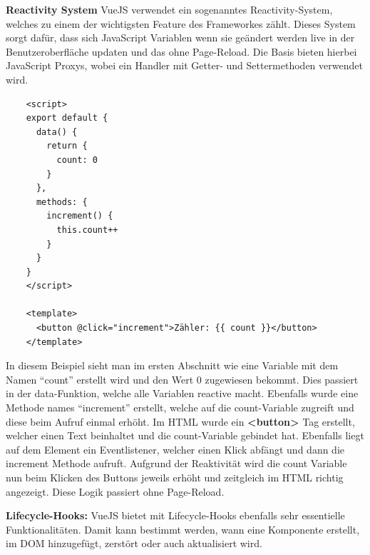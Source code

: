 \cite{frontend_web_vuejs_api}

\textbf{Reactivity System}
\newline
VueJS verwendet ein sogenanntes Reactivity-System, welches zu einem der wichtigsten Feature des Frameworkes zählt. Dieses System sorgt dafür, dass sich JavaScript Variablen wenn sie geändert werden live in der Benutzeroberfläche updaten und das ohne Page-Reload. Die Basis bieten hierbei JavaScript Proxys, wobei ein Handler mit Getter- und Settermethoden verwendet wird. 

\begin{lstlisting}
    <script>
    export default {
      data() {
        return {
          count: 0
        }
      },
      methods: {
        increment() {
          this.count++
        }
      }
    }
    </script>
    
    <template>
      <button @click="increment">Zähler: {{ count }}</button>
    </template>
\end{lstlisting}

\cite{frontend_web_vuejs_reactivity}

In diesem Beispiel sieht man im ersten Abschnitt wie eine Variable mit dem Namen “count” erstellt wird und den Wert 0 zugewiesen bekommt. Dies passiert in der data-Funktion, welche alle Variablen reactive macht. Ebenfalls wurde eine Methode names “increment” erstellt, welche auf die count-Variable zugreift und diese beim Aufruf einmal erhöht. Im HTML wurde ein \textbf{<button>} Tag erstellt, welcher einen Text beinhaltet und die count-Variable gebindet hat. Ebenfalls liegt auf dem Element ein Eventlistener, welcher einen Klick abfängt und dann die increment Methode aufruft.
Aufgrund der Reaktivität wird die count Variable nun beim Klicken des Buttons jeweils erhöht und zeitgleich im HTML richtig angezeigt. Diese Logik passiert ohne Page-Reload.

\cite{frontend_web_vuejs_reactivity2}

\textbf{Lifecycle-Hooks:}
\newline
VueJS bietet mit Lifecycle-Hooks ebenfalls sehr essentielle Funktionalitäten. Damit kann bestimmt werden, wann eine Komponente erstellt, im DOM hinzugefügt, zerstört oder auch aktualisiert wird. 

